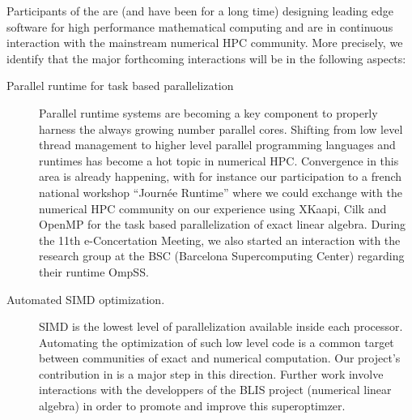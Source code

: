 Participants of the  are (and have been for a long time) designing
leading edge software for high performance mathematical computing and are in
continuous interaction with the mainstream numerical HPC community.
More precisely, we identify that the major forthcoming interactions will be in
the following aspects:
\begin{description}
\item[Parallel runtime for task based parallelization] Parallel runtime systems
  are becoming a key component to properly harness the always growing number
  parallel cores. Shifting from low level thread management to higher level
  parallel programming languages and runtimes has become a hot topic in numerical
  HPC. Convergence in this area is already happening, with for instance our
  participation to a french national workshop ``Journée Runtime'' where we could exchange with the
  numerical HPC community on our experience using XKaapi, Cilk and OpenMP for the task
  based parallelization of exact linear algebra. During the 11th e-Concertation
  Meeting, we also started an interaction with the research group at the BSC
  (Barcelona Supercomputing Center) regarding their runtime OmpSS.
\item[Automated SIMD optimization.] SIMD is the lowest level of parallelization
  available inside each processor. Automating the optimization of such low level code is a common target
  between communities of exact and numerical computation. 
  Our project's contribution in   is a major
  step in this direction. Further work  involve interactions with the developpers of the BLIS project
  (numerical linear algebra) in order to promote and improve this superoptimzer.
\end{description}






